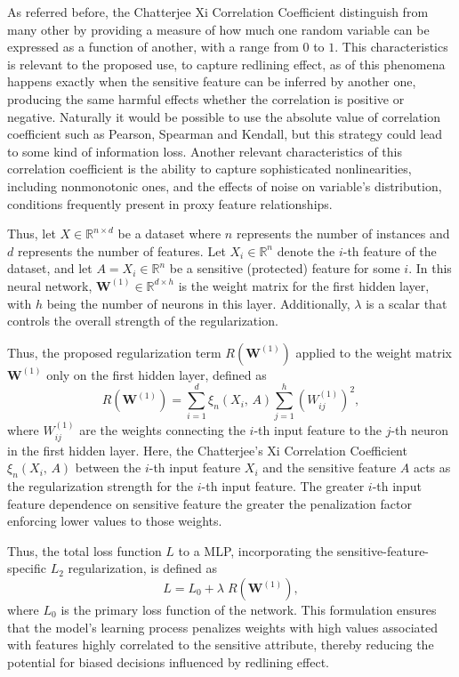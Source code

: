 As referred before, the Chatterjee Xi Correlation Coefficient distinguish from many other by providing a measure of how much one random variable can be expressed as a function of another, with a range from $0$ to $1$. This characteristics is relevant to the proposed use, to capture redlining effect, as of this phenomena happens exactly when the sensitive feature can be inferred by another one, producing the same harmful effects whether the correlation is positive or negative. Naturally it would be possible to use the absolute value of correlation coefficient such as Pearson, Spearman and Kendall, but this strategy could lead to some kind of information loss. Another relevant characteristics of this correlation coefficient is the ability to capture sophisticated nonlinearities, including nonmonotonic ones, and the effects of noise on variable's distribution, conditions frequently present in proxy feature relationships. 

Thus, let $X \in \mathbb{R}^{n \times d}$ be a dataset where $n$ represents the number of instances and $d$ represents the number of features. Let $X_i \in \mathbb{R}^n$ denote the $i$-th feature of the dataset, and let $A = X_i \in \mathbb{R}^n$ be a sensitive (protected) feature for some $i$. In this neural network, $\mathbf{W}^{(1)} \in \mathbb{R}^{d \times h}$ is the weight matrix for the first hidden layer, with $h$ being the number of neurons in this layer. Additionally, $\lambda$ is a scalar that controls the overall strength of the regularization.

Thus, the proposed regularization term $R(\mathbf{W}^{(1)})$ applied to the weight matrix $\mathbf{W}^{(1)}$ only on the first hidden layer, defined as 
\begin{equation}\label{eq:xi_reg}
R(\mathbf{W}^{(1)}) = \sum_{i=1}^d \xi_n(X_i,\,A) \sum_{j=1}^h (W^{(1)}_{ij})^2,
\end{equation}
where $W^{(1)}_{ij}$ are the weights connecting the $i$-th input feature to the $j$-th neuron in the first hidden layer. Here, the Chatterjee's Xi Correlation Coefficient $\xi_n(X_i,\,A)$ between the $i$-th input feature $X_i$ and the sensitive feature $A$ acts as the regularization strength for the $i$-th input feature. The greater $i$-th input feature dependence on sensitive feature the greater the penalization factor enforcing lower values to those weights.

Thus, the total loss function $L$ to a MLP, incorporating the sensitive-feature-specific $L_2$ regularization, is defined as
\begin{equation}\label{eq:total_regularized_loss}
L = L_0 + \lambda \; R(\mathbf{W}^{(1)}),
\end{equation}
where $L_0$ is the primary loss function of the network. This formulation ensures that the model's learning process penalizes weights with high values associated with features highly correlated to the sensitive attribute, thereby reducing the potential for biased decisions influenced by redlining effect.

